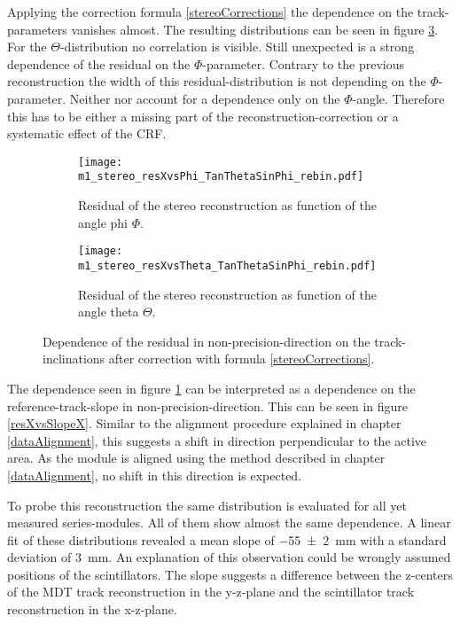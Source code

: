 \documentclass[
twoside,            %
BCOR1.4cm,          %
10pt,               %
headings=normal,    %
headsepline,        %
clearplainpage,		%
final,              %
div=14,
open=right,
bibliography=toc
]{scrreprt}
\begin{document}
Applying the correction formula \ref{stereoCorrections} the dependence on the track-parameters vanishes almost.
The resulting distributions can be seen in figure \ref{stereoXcor}.
For the $\Theta$-distribution no correlation is visible.
Still unexpected is a strong dependence of the residual on the $\Phi$-parameter.
Contrary to the previous reconstruction the width of this residual-distribution is not depending on the $\Phi$-parameter.
Neither \cite{stereoMicromegas} nor \cite{flierlThesis} account for a dependence only on the $\Phi$-angle.
Therefore this has to be either a missing part of the reconstruction-correction or a systematic effect of the CRF.

\begin{figure}[!h]
	\begin{subfigure}[b]{0.48\textwidth}
		\centering
		\texttt{[image: m1\_stereo\_resXvsPhi\_TanThetaSinPhi\_rebin.pdf]}
		\caption{Residual of the stereo reconstruction as function of the angle phi $\Phi$.}
		\label{resXvsPhi_BF} 
	\end{subfigure}
	\hfill
	\begin{subfigure}[b]{0.48\textwidth}
		\centering
		\texttt{[image: m1\_stereo\_resXvsTheta\_TanThetaSinPhi\_rebin.pdf]}
		\caption{Residual of the stereo reconstruction as function of the angle theta $\Theta$.}
		\label{resXvsTheta_BF} 
	\end{subfigure}
	\vspace{-2mm}
	\caption{
		Dependence of the residual in non-precision-direction on the track-inclinations after correction with formula \ref{stereoCorrections}.
	}
	\label{stereoXcor}
	\vspace{-2mm}
\end{figure}

The dependence seen in figure \ref{resXvsPhi_BF} can be interpreted as a dependence on the reference-track-slope in non-precision-direction.
This can be seen in figure \ref{resXvsSlopeX}.
Similar to the alignment procedure explained in chapter \ref{dataAlignment}, this suggests a shift in direction perpendicular to the active area.
As the module is aligned using the method described in chapter \ref{dataAlignment}, no shift in this direction is expected.

To probe this reconstruction the same distribution is evaluated for all yet measured series-modules.
All of them show almost the same dependence.
A linear fit of these distributions revealed a mean slope of \SI{-55(2)}{mm} with a standard deviation of \SI{3}{mm}.
An explanation of this observation could be wrongly assumed positions of the scintillators.
The slope suggests a difference between the z-centers of the MDT track reconstruction in the y-z-plane and the scintillator track reconstruction in the x-z-plane. 
\end{document}
